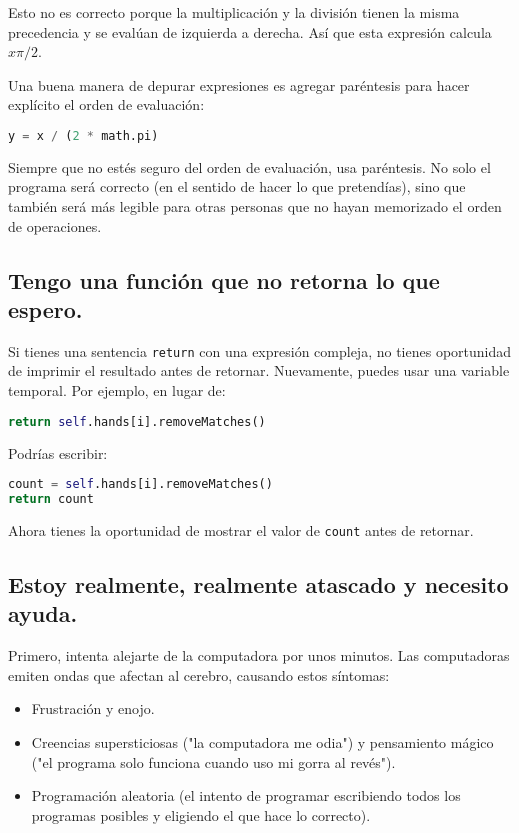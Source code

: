 Esto no es correcto porque la multiplicación y la división tienen la misma precedencia y se evalúan de izquierda a derecha. Así que esta expresión calcula $x\pi/2$.

Una buena manera de depurar expresiones es agregar paréntesis para hacer explícito el orden de evaluación:

\begin{lstlisting}[language=Python]
y = x / (2 * math.pi)
\end{lstlisting}

Siempre que no estés seguro del orden de evaluación, usa paréntesis. No solo el programa será correcto (en el sentido de hacer lo que pretendías), sino que también será más legible para otras personas que no hayan memorizado el orden de operaciones.

\subsection{Tengo una función que no retorna lo que espero.}

Si tienes una sentencia \texttt{return} con una expresión compleja, no tienes oportunidad de imprimir el resultado antes de retornar. Nuevamente, puedes usar una variable temporal. Por ejemplo, en lugar de:

\begin{lstlisting}[language=Python]
return self.hands[i].removeMatches()
\end{lstlisting}

Podrías escribir:

\begin{lstlisting}[language=Python]
count = self.hands[i].removeMatches()
return count
\end{lstlisting}

Ahora tienes la oportunidad de mostrar el valor de \texttt{count} antes de retornar.

\subsection{Estoy realmente, realmente atascado y necesito ayuda.}

Primero, intenta alejarte de la computadora por unos minutos. Las computadoras emiten ondas que afectan al cerebro, causando estos síntomas:

\begin{itemize}
    \item Frustración y enojo.
    \item Creencias supersticiosas ("la computadora me odia") y pensamiento mágico ("el programa solo funciona cuando uso mi gorra al revés").
    \item Programación aleatoria (el intento de programar escribiendo todos los programas posibles y eligiendo el que hace lo correcto).
\end{itemize}

